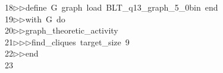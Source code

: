 \begin{tabbing}
18\>$\triangleright$\>$\triangleright$\>define\ G\ graph\ load\ BLT\_q13\_graph\_5\_0bin\ end\ \\[0pt]
19\>$\triangleright$\>$\triangleright$\>with\ G\ do\ \\[0pt]
20\>$\triangleright$\>$\triangleright$\>graph\_theoretic\_activity\ \\[0pt]
21\>$\triangleright$\>$\triangleright$\>$\triangleright$\>find\_cliques\ target\_size\ 9\ \\[0pt]
22\>$\triangleright$\>$\triangleright$\>end\\[0pt]
23\>\end{tabbing}
